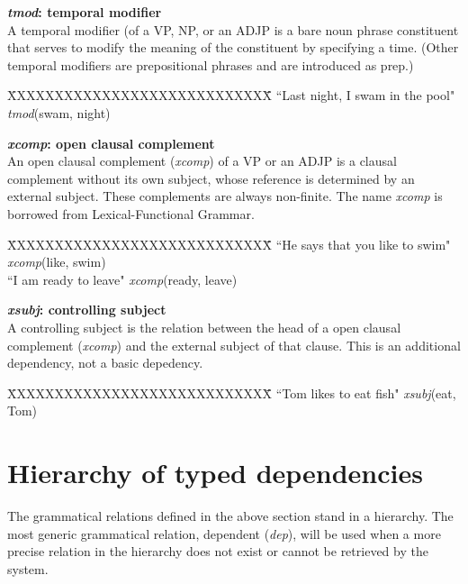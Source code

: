 \documentclass[11pt,letter]{article}
\begin{document}
\noindent\textbf{\emph{tmod}: temporal modifier}\\
A temporal modifier (of a VP, NP, or an ADJP is a bare noun phrase constituent that serves to modify the meaning of the constituent by specifying a time.  (Other temporal modifiers are prepositional phrases and are introduced as prep.)
\begin{tabbing}
\hspace{1cm} \=XXXXXXXXXXXXXXXXXXXXXXXXXXXX\= \hspace{1cm}\=  \kill
\> ``Last night, I swam in the pool" \> \> \emph{tmod}(swam, night)\\
\end{tabbing}

\noindent\textbf{\emph{xcomp}: open clausal complement}\\
An open clausal complement (\emph{xcomp}) of a VP or an ADJP is a clausal complement without its own subject, whose reference is determined by an external subject.  These complements are always non-finite.  The name \emph{xcomp} is borrowed from Lexical-Functional Grammar.
\begin{tabbing}
	\hspace{1cm} \=XXXXXXXXXXXXXXXXXXXXXXXXXXXX\= \hspace{1cm}\=  \kill
\>  ``He says that you like to swim" \> \> \emph{xcomp}(like, swim)\\
\hspace{1cm} \> ``I am ready to leave" \> \>  \emph{xcomp}(ready, leave)\\
\end{tabbing}

\noindent\textbf{\emph{xsubj}: controlling subject}\\
A controlling subject is the relation between the head of a open clausal complement (\emph{xcomp}) and the external subject of that clause.
This is an additional dependency, not a basic depedency.
\begin{tabbing}
	\hspace{1cm} \=XXXXXXXXXXXXXXXXXXXXXXXXXXXX\= \hspace{1cm}\=  \kill
\> ``Tom likes to eat fish" \> \> \emph{xsubj}(eat, Tom)\\
\end{tabbing}

\section{Hierarchy of typed dependencies}\label{hierarchy}
The grammatical relations defined in the above section stand in a hierarchy. The most generic grammatical relation, dependent (\emph{dep}), will be used when a more precise relation in the hierarchy does not exist or cannot be retrieved by the system.
\end{document}
